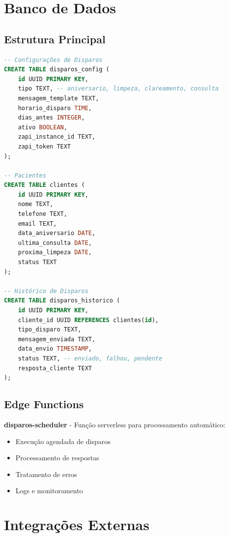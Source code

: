 \documentclass[11pt,a4paper]{article}
\newcommand{\sectiontitle}[1]{\section{\color{oraldentsblue}#1}}
\begin{document}
\sectiontitle{Banco de Dados}

\subsection{Estrutura Principal}
\begin{lstlisting}[language=SQL, caption=Tabelas Principais]
-- Configurações de Disparos
CREATE TABLE disparos_config (
    id UUID PRIMARY KEY,
    tipo TEXT, -- aniversario, limpeza, clareamento, consulta
    mensagem_template TEXT,
    horario_disparo TIME,
    dias_antes INTEGER,
    ativo BOOLEAN,
    zapi_instance_id TEXT,
    zapi_token TEXT
);

-- Pacientes
CREATE TABLE clientes (
    id UUID PRIMARY KEY,
    nome TEXT,
    telefone TEXT,
    email TEXT,
    data_aniversario DATE,
    ultima_consulta DATE,
    proxima_limpeza DATE,
    status TEXT
);

-- Histórico de Disparos
CREATE TABLE disparos_historico (
    id UUID PRIMARY KEY,
    cliente_id UUID REFERENCES clientes(id),
    tipo_disparo TEXT,
    mensagem_enviada TEXT,
    data_envio TIMESTAMP,
    status TEXT, -- enviado, falhou, pendente
    resposta_cliente TEXT
);
\end{lstlisting}

\subsection{Edge Functions}
\begin{tcolorbox}[colback=blue!5!white,colframe=oraldentsblue]
\textbf{disparos-scheduler} - Função serverless para processamento automático:
\begin{itemize}
    \item Execução agendada de disparos
    \item Processamento de respostas
    \item Tratamento de erros
    \item Logs e monitoramento
\end{itemize}
\end{tcolorbox}

\sectiontitle{Integrações Externas}
\end{document}
